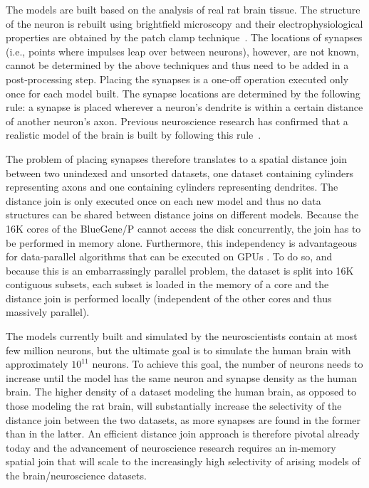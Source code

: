 \documentclass{vldb}
\begin{document}
The models are built based on the analysis of real rat brain tissue. The structure of the neuron is rebuilt using brightfield microscopy and their
electrophysiological properties are obtained by the patch clamp technique~\cite{patchclamp}. The locations of synapses (i.e., points where impulses leap over
between neurons), however, are not known, cannot be determined by the above techniques and thus need to be added in a post-processing step. Placing the synapses
is a one-off operation executed only once for each model built. The synapse locations are determined by the following rule: a synapse is placed wherever a
neuron's dendrite is within a certain distance of another neuron's axon. Previous neuroscience research has confirmed that a realistic model of the brain is
built by following this rule~\cite{tabulating}.


The problem of placing synapses therefore translates to a spatial distance join between two unindexed and unsorted datasets, one dataset containing cylinders
representing axons and one containing cylinders representing dendrites. The distance join is only executed once on each new model and thus no data structures
can be shared between distance joins on different models. Because the 16K cores of the BlueGene/P cannot access the disk concurrently, the join has to be
performed in memory alone. Furthermore, this independency is advantageous for data-parallel algorithms that can be executed on GPUs \cite{nobariGPU}.  To do so, and because this is an embarrassingly parallel problem, the dataset is split into 16K contiguous subsets, each subset is
loaded in the memory of a core and the distance join is performed locally (independent of the other cores and thus massively parallel).


The models currently built and simulated by the neuroscientists contain at most few million neurons, but the ultimate goal is to simulate the human brain with
approximately $10^{11}$ neurons. To achieve this goal, the number of neurons needs to increase until the model has the same neuron and synapse density as the
human brain. The higher density of a dataset modeling the human brain, as opposed to those modeling the rat brain, will substantially increase the selectivity
of the distance join between the two datasets, as more synapses are found in the former than in the latter. An efficient distance join approach is therefore
pivotal already today and the advancement of neuroscience research requires an in-memory spatial join that will scale to the increasingly high selectivity of
arising models of the brain/neuroscience datasets.
\end{document}
